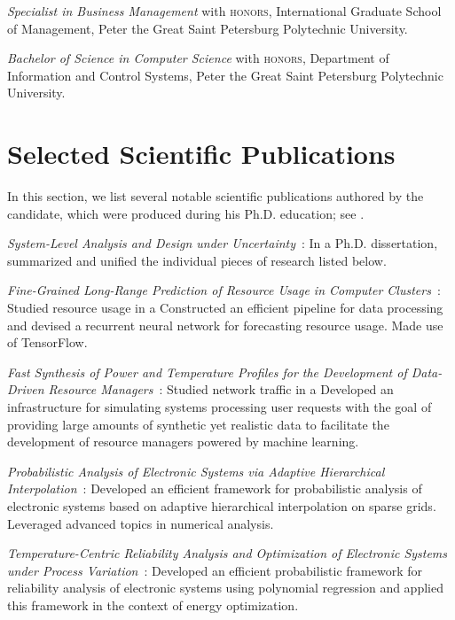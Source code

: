 \documentclass[journal]{IEEEtran}
\begin{document}
\date{2010} \emph{Specialist in Business Management} with \textsc{honors},
International Graduate School of Management, Peter the Great Saint Petersburg
Polytechnic University.

\date{2008} \emph{Bachelor of Science in Computer Science} with \textsc{honors},
Department of Information and Control Systems, Peter the Great Saint Petersburg
Polytechnic University.

\section{Selected Scientific Publications} 

In this section, we list several notable scientific publications authored by the
candidate, which were produced during his Ph.D. education; see .

\date{2017} \emph{System-Level Analysis and Design under
Uncertainty}~\cite{ukhov2017d}: In a Ph.D. dissertation, summarized and
unified the individual pieces of research listed below.

\date{2017} \emph{Fine-Grained Long-Range Prediction of Resource Usage in
Computer Clusters}~\cite{ukhov2017b}: Studied resource usage in a
 Constructed
an efficient pipeline for data processing and devised a recurrent neural network
for forecasting resource usage. Made use of TensorFlow.

\date{2017} \emph{Fast Synthesis of Power and Temperature Profiles for the
Development of Data-Driven Resource Managers}~\cite{ukhov2017c}: Studied network
traffic in a 
Developed an infrastructure for simulating systems processing user requests with
the goal of providing large amounts of synthetic yet realistic data to
facilitate the development of resource managers powered by machine learning.

\date{2017} \emph{Probabilistic Analysis of Electronic Systems via Adaptive
Hierarchical Interpolation}~\cite{ukhov2017a}: Developed an efficient framework
for probabilistic analysis of electronic systems based on adaptive hierarchical
interpolation on sparse grids. Leveraged advanced topics in numerical analysis.

\date{2015} \emph{Temperature-Centric Reliability Analysis and Optimization of
Electronic Systems under Process Variation}~\cite{ukhov2015}: Developed an
efficient probabilistic framework for reliability analysis of electronic systems
using polynomial regression and applied this framework in the context of energy
optimization.
\end{document}
